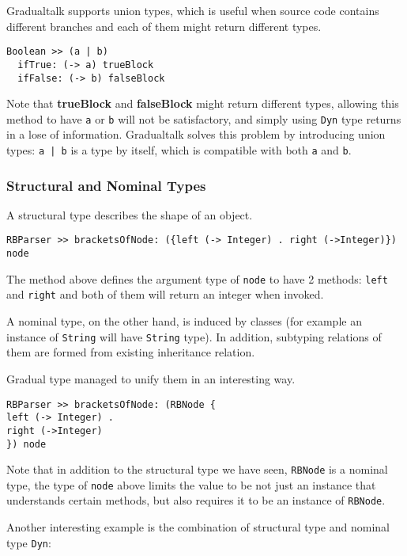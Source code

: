 Gradualtalk supports union types, which is useful when
source code contains different branches and each of them might return different types.

\begin{verbatim}
Boolean >> (a | b)
  ifTrue: (-> a) trueBlock
  ifFalse: (-> b) falseBlock
\end{verbatim}

Note that \textbf{trueBlock} and \textbf{falseBlock} might return
different types, allowing this method to have \texttt{a} or \texttt{b}
will not be satisfactory, and simply using \texttt{Dyn} type
returns in a lose of information.
Gradualtalk solves this problem by introducing union types: \texttt{a | b}
is a type by itself, which is compatible with both \texttt{a} and \texttt{b}.

\subsubsection{Structural and Nominal Types}

A structural type describes the shape of an object.

\begin{verbatim}
RBParser >> bracketsOfNode: ({left (-> Integer) . right (->Integer)}) node
\end{verbatim}

The method above defines the argument type of \texttt{node} to have 2 methods:
\texttt{left} and \texttt{right} and both of them will return an integer when invoked.

A nominal type, on the other hand, is induced by classes
(for example an instance of \texttt{String} will have \texttt{String} type).
In addition, subtyping relations of them are formed from existing inheritance relation.

Gradual type managed to unify them in an interesting way.

\begin{verbatim}
RBParser >> bracketsOfNode: (RBNode {
left (-> Integer) .
right (->Integer)
}) node
\end{verbatim}

Note that in addition to the structural type we have seen,
\texttt{RBNode} is a nominal type, the type of \texttt{node} above
limits the value to be not just an instance that understands certain methods,
but also requires it to be an instance of \texttt{RBNode}.

Another interesting example is the combination of structural type
and nominal type \texttt{Dyn}:

